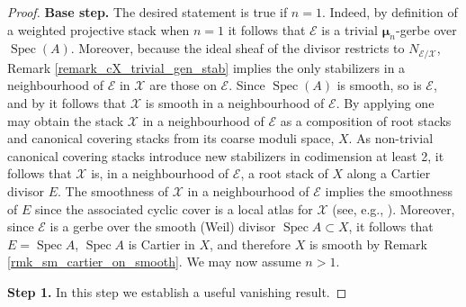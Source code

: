 \documentclass{amsart}
\newcommand{\cE}{\mathcal{E}}
\newcommand{\cP}{\mathcal{P}}
\newcommand{\cX}{\mathcal{X}}
\newcommand{\spec}{\operatorname{Spec}}
\newcommand{\bmu}{\bm{\mu}}
\theoremstyle{definition}
\newcommand{\marg}[1]{\normalsize{{\color{red}\footnote{{\color{blue}#1}}}{\marginpar[{\color{red}\hfill\tiny\thefootnote$\rightarrow$}]{{\color{red}$\leftarrow$\tiny\thefootnote}}}}}
\newcommand{\Gio}[1]{\marg{(Giovanni) #1}}
\begin{document}
\begin{proof}
\textbf{Base step.} 
The desired statement is true if $n=1$. Indeed, by definition of a weighted projective stack when $n=1$ it follows that $\cE$ is a trivial $\bmu_n$-gerbe over $\spec(A)$. Moreover, because the ideal sheaf of the divisor restricts to $N_{\cE/\cX}$, Remark \ref{remark_cX_trivial_gen_stab} implies the only stabilizers in a neighbourhood of $\cE$ in $\cX$ are those on $\cE$. Since $\spec(A)$ is smooth, so is $\cE$, and by  it follows that $\cX$ is smooth in a neighbourhood of $\cE$.
By applying \cite[Thm. 1]{GS17} one may obtain the stack $\cX$ in a neighbourhood of $\cE$ as a composition of root stacks and canonical covering stacks from its coarse moduli space, $X$. As non-trivial canonical covering stacks introduce new stabilizers in codimension at least 2, it follows that $\cX$ is, in a neighbourhood of $\cE$, a root stack of $X$ along a Cartier divisor $E$. The smoothness of $\cX$ in
a neighbourhood of $\cE$ implies the smoothness of $E$ since the associated cyclic cover is a local atlas for $\cX$ (see, e.g., \cite[Prop. 3.15]{javanpeykar_loughran_mathur_2022}). Moreover, since $\cE$ is a gerbe over the smooth (Weil) divisor $\spec A \subset X$, it follows that $E=\spec A$, $\spec A$ is Cartier in $X$, and therefore $X$ is smooth by Remark \ref{rmk_sm_cartier_on_smooth}. We may now assume $n>1$.


\textbf{Step 1.} In this step we establish a useful vanishing result. 



\end{proof}
\end{document}
